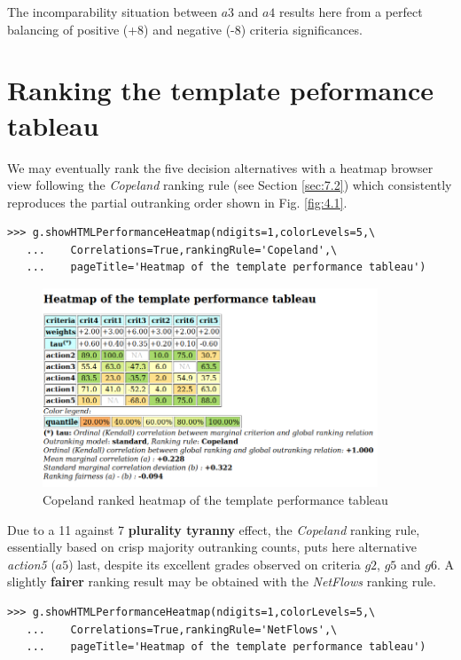The incomparability situation between $a3$ and $a4$ results here from a perfect balancing of positive (+8) and negative (-8) criteria significances.

\section{Ranking the template peformance tableau}
\label{sec:4.7}

We may eventually rank the five decision alternatives with a heatmap browser view following the \emph{Copeland} ranking rule (see Section \ref{sec:7.2}) which consistently reproduces the partial outranking order shown in Fig. \ref{fig:4.1}. 

\begin{lstlisting}[basicstyle=\footnotesize] 
   >>> g.showHTMLPerformanceHeatmap(ndigits=1,colorLevels=5,\
   ...    Correlations=True,rankingRule='Copeland',\
   ...    pageTitle='Heatmap of the template performance tableau')
\end{lstlisting}

\begin{figure}[h]
\includegraphics[width=10cm]{Figures/templateHeatmapCop.png}
\caption{Copeland ranked heatmap of the template performance tableau}
\label{fig:4.2}       %
\end{figure}

Due to a 11 against 7 \textbf{plurality tyranny} effect, the \emph{Copeland} ranking rule, essentially based on crisp majority outranking counts, puts here alternative \emph{action5} ($a5$) last, despite its excellent grades observed on criteria $g2$, $g5$ and $g6$. A slightly \textbf{fairer} ranking result may be obtained with the \emph{NetFlows} ranking rule.

\begin{lstlisting}[basicstyle=\footnotesize] 
   >>> g.showHTMLPerformanceHeatmap(ndigits=1,colorLevels=5,\
   ...    Correlations=True,rankingRule='NetFlows',\
   ...    pageTitle='Heatmap of the template performance tableau')
\end{lstlisting}

